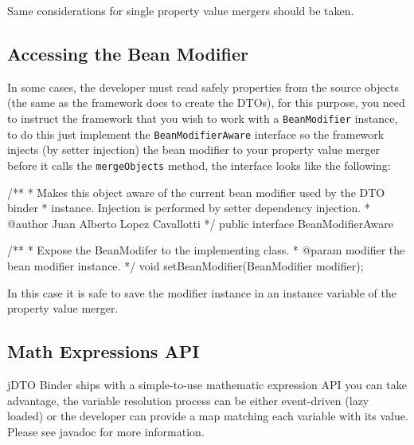 \documentclass[11pt]{article}
\newcommand{\JDTO}{jDTO Binder\xspace}
\begin{document}
Same considerations for single property value mergers should be taken.

\subsection{Accessing the Bean Modifier}

In some cases, the developer must read safely properties from the source objects (the same as the framework does to create the DTOs), for this purpose, you need to instruct the framework that you wish to work with a \texttt{BeanModifier} instance, to do this just implement the \texttt{BeanModifierAware} interface so the framework injects (by setter injection) the bean modifier to your property value merger before it calls the \texttt{mergeObjects} method, the interface looks like the following:

\begin{java}
/**
 * Makes this object aware of the current bean modifier used by the DTO binder
 * instance. Injection is performed by setter dependency injection.
 * @author Juan Alberto Lopez Cavallotti
 */
public interface BeanModifierAware {
    
    /**
     * Expose the BeanModifer to the implementing class.
     * @param modifier the bean modifier instance.
     */
    void setBeanModifier(BeanModifier modifier);
}
\end{java}

In this case it is safe to save the modifier instance in an instance variable of the property value merger.

\subsection{Math Expressions API}

\JDTO ships with a simple-to-use mathematic expression API you can take advantage, the variable resolution process can be either event-driven (lazy loaded) or the developer can provide a map matching each variable with its value. Please see javadoc for more information.
\end{document}
